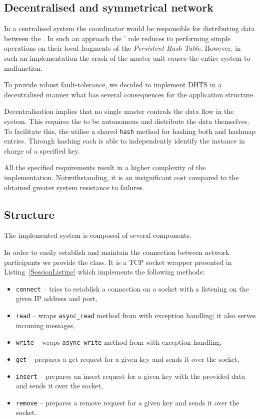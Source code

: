     \subsection{Decentralised and symmetrical network}
        In a centralised system the coordinator would be responsible for distributing data between the \Nodes. 
        In such an approach the \Nodes' role reduces to performing simple \PHT operations on their local fragments of the \textit{Persistent Hash Table}.
        However, in such an implementation the crash of the master unit causes the entire system to malfunction.
        
        To provide robust fault-tolerance, we decided to implement DHTS in a decentralised manner what has several consequences for the application structure.
    
        Decentralisation implies that no single master controls the data flow in the system.
        This requires the \Nodes to be autonomous and distribute the data themselves.
        To facilitate this, the \Nodes utilise a shared \texttt{hash} method for hashing both \Nodes and hashmap entries.
        Through hashing each \Node is able to independently identify the instance in charge of a specified key.
        
        All the specified requirements result in a higher complexity of the \Node implementation.
        Notwithstanding, it is an insignificant cost compared to the obtained greater system resistance to failures.

    \subsection{Structure}
        The implemented system is composed of several components.

        In order to easily establish and maintain the connection between network participants we provide the \Session class.
        It is a TCP socket wrapper presented in Listing~\ref{SessionListing} which implements the following methods:
        
        \begin{itemize}
            \item \texttt{connect} -- tries to establish a connection on a socket with a \Node listening on the given IP address and port,
            \item \texttt{read} -- wraps \texttt{async\_read} method from \Asio with exception handling; it also serves incoming messages,
            \item \texttt{write} -- wraps \texttt{async\_write} method from \Asio with exception handling,
            \item \texttt{get} -- prepares a get request for a given key and sends it over the socket,
            \item \texttt{insert} -- prepares an insert request for a given key with the provided data and sends it over the socket,
            \item \texttt{remove} -- prepares a remove request for a given key and sends it over the socket.
        \end{itemize}

